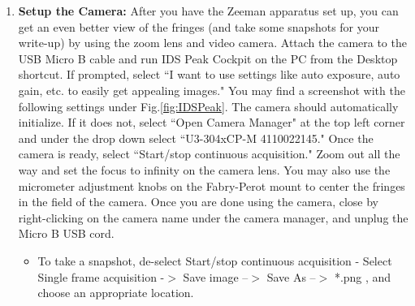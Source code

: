 \documentclass{../lab}
\begin{document}
\begin{enumerate}
\begin{itemize}
\begin{itemize}
\begin{enumerate}
                \item \textbf{Setup the Camera:} After you have the Zeeman apparatus set up, you can get an even better view of the fringes (and take some snapshots for your write-up) by using the zoom lens and video camera. Attach the camera to the USB Micro B cable and run IDS Peak Cockpit on the PC from the Desktop shortcut. If prompted, select ``I want to use settings like auto exposure, auto gain, etc. to easily get appealing images." You may find a screenshot with the following settings under Fig.\ref{fig:IDSPeak}. The camera should automatically initialize. If it does not, select ``Open Camera Manager" at the top left corner and under the drop down select ``U3-304xCP-M 4110022145." Once the camera is ready, select ``Start/stop continuous acquisition." Zoom out all the way and set the focus to infinity on the camera lens. You may also use the micrometer adjustment knobs on the Fabry-Perot mount to center the fringes in the field of the camera. Once you are done using the camera, close by right-clicking on the camera name under the camera manager, and unplug the Micro B USB cord.
                
                
                
                
            
                \begin{itemize}
                    \item To take a snapshot, de-select Start/stop continuous acquisition - Select Single frame acquisition -$>$ Save image --$>$ Save As --$>$ *.png , and choose an appropriate location.
                \end{itemize}



\end{enumerate}
\end{itemize}
\end{itemize}
\end{enumerate}
\end{document}
